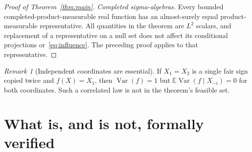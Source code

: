 \documentclass[11pt]{article}
\numberwithin{equation}{section}
\theoremstyle{remark}
\newtheorem{remark}[theorem]{Remark}
\newcommand{\E}{\mathbb E}
\newcommand{\Var}{\operatorname{Var}}
\begin{document}
\begin{proof}[Proof of Theorem~\ref{thm:main}]
\emph{Completed sigma-algebras.} Every bounded completed-product-measurable real function has an almost-surely equal product-measurable representative. All quantities in the theorem are $L^2$ scalars, and replacement of a representative on a null set does not affect its conditional projections or~\eqref{eq:influence}. The preceding proof applies to that representative.
\end{proof}

\begin{remark}[Independent coordinates are essential]
If $X_1=X_2$ is a single fair sign copied twice and $f(X)=X_1$, then $\Var(f)=1$ but $\E\Var(f\mid X_{-i})=0$ for both coordinates. Such a correlated law is not in the theorem's feasible set.
\end{remark}

\section{What is, and is not, formally verified}\label{sec:formal}
\end{document}

